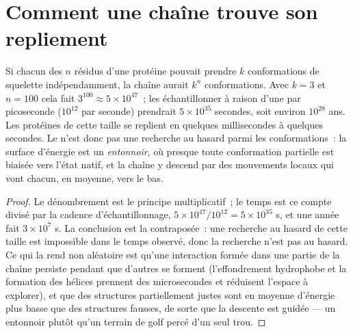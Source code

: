 \section{Comment une chaîne trouve son repliement}

\begin{theorem}\label{thm:b3:structural-biology:levinthal}
Si chacun des $n$ résidus d'une protéine pouvait prendre $k$
conformations de squelette indépendamment, la chaîne aurait $k^{n}$
conformations. Avec $k = 3$ et $n = 100$ cela fait $3^{100} \approx
5\times 10^{47}$~; les échantillonner à raison d'une par picoseconde
($10^{12}$ par seconde) prendrait $5\times 10^{35}$ secondes, soit
environ $10^{28}$ ans. Les protéines de cette taille se replient en
quelques millisecondes à quelques secondes. Le  n'est donc
pas une recherche au hasard parmi les conformations~: la surface
d'énergie est un \emph{entonnoir}, où presque toute conformation
partielle est biaisée vers l'état natif, et la chaîne y descend par des
mouvements locaux qui vont chacun, en moyenne, vers le bas.
\end{theorem}
\begin{proof}
Le dénombrement est le principe multiplicatif~; le temps est ce compte
divisé par la cadence d'échantillonnage,
$5\times 10^{47}/10^{12} = 5\times
10^{35}$ s, et une année fait $3\times 10^{7}$ s. La conclusion est la
contraposée~: une recherche au hasard de cette taille est impossible
dans le temps observé, donc la recherche n'est pas au hasard. Ce qui la
rend non aléatoire est qu'une interaction formée dans une partie de la
chaîne persiste pendant que d'autres se forment (l'effondrement
hydrophobe et la formation des hélices prennent des microsecondes et
réduisent l'espace à explorer), et que des structures partiellement
justes sont en moyenne d'énergie plus basse que des structures fausses,
de sorte que la descente est guidée --- un entonnoir plutôt qu'un
terrain de golf percé d'un seul trou.
\end{proof}

